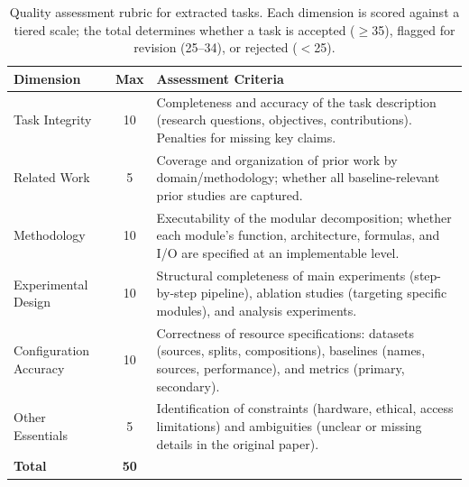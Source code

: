 \begin{table}[htbp]
\centering
\footnotesize
\setlength{\tabcolsep}{1.5mm}
\renewcommand{\arraystretch}{1.08}
\begin{tabularx}{\columnwidth}{@{}p{2.2cm}c>{\raggedright\arraybackslash}X@{}}
\toprule
\textbf{Dimension} & \textbf{Max} & \textbf{Assessment Criteria} \\
\midrule
Task Integrity & 10 & Completeness and accuracy of the task description (research questions, objectives, contributions). Penalties for missing key claims. \\[2pt]
Related Work & 5 & Coverage and organization of prior work by domain/methodology; whether all baseline-relevant prior studies are captured. \\[2pt]
Methodology & 10 & Executability of the modular decomposition; whether each module's function, architecture, formulas, and I/O are specified at an implementable level. \\[2pt]
Experimental Design & 10 & Structural completeness of main experiments (step-by-step pipeline), ablation studies (targeting specific modules), and analysis experiments. \\[2pt]
Configuration Accuracy & 10 & Correctness of resource specifications: datasets (sources, splits, compositions), baselines (names, sources, performance), and metrics (primary, secondary). \\[2pt]
Other Essentials & 5 & Identification of constraints (hardware, ethical, access limitations) and ambiguities (unclear or missing details in the original paper). \\
\midrule
\textbf{Total} & \textbf{50} & \\
\bottomrule
\end{tabularx}
\caption{Quality assessment rubric for extracted tasks. Each dimension is scored against a tiered scale; the total determines whether a task is accepted ($\geq$35), flagged for revision (25--34), or rejected ($<$25).}
\label{tab:quality}
\end{table}


